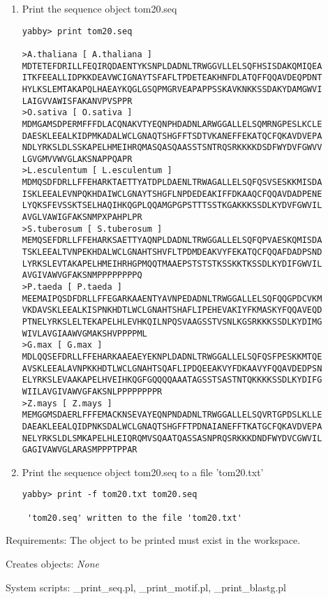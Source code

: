 \begin{description}
\begin{enumerate}
\item Print the sequence object tom20.seq
\begin{verbatim}
yabby> print tom20.seq

>A.thaliana [ A.thaliana ]
MDTETEFDRILLFEQIRQDAENTYKSNPLDADNLTRWGGVLLELSQFHSISDAKQMIQEA
ITKFEEALLIDPKKDEAVWCIGNAYTSFAFLTPDETEAKHNFDLATQFFQQAVDEQPDNT
HYLKSLEMTAKAPQLHAEAYKQGLGSQPMGRVEAPAPPSSKAVKNKKSSDAKYDAMGWVI
LAIGVVAWISFAKANVPVSPPR
>O.sativa [ O.sativa ]
MDMGAMSDPERMFFFDLACQNAKVTYEQNPHDADNLARWGGALLELSQMRNGPESLKCLE
DAESKLEEALKIDPMKADALWCLGNAQTSHGFFTSDTVKANEFFEKATQCFQKAVDVEPA
NDLYRKSLDLSSKAPELHMEIHRQMASQASQAASSTSNTRQSRKKKKDSDFWYDVFGWVV
LGVGMVVWVGLAKSNAPPQAPR
>L.esculentum [ L.esculentum ]
MDMQSDFDRLLFFEHARKTAETTYATDPLDAENLTRWAGALLELSQFQSVSESKKMISDA
ISKLEEALEVNPQKHDAIWCLGNAYTSHGFLNPDEDEAKIFFDKAAQCFQQAVDADPENE
LYQKSFEVSSKTSELHAQIHKQGPLQQAMGPGPSTTTSSTKGAKKKSSDLKYDVFGWVIL
AVGLVAWIGFAKSNMPXPAHPLPR
>S.tuberosum [ S.tuberosum ]
MEMQSEFDRLLFFEHARKSAETTYAQNPLDADNLTRWGGALLELSQFQPVAESKQMISDA
TSKLEEALTVNPEKHDALWCLGNAHTSHVFLTPDMDEAKVYFEKATQCFQQAFDADPSND
LYRKSLEVTAKAPELHMEIHRHGPMQQTMAAEPSTSTSTKSSKKTKSSDLKYDIFGWVIL
AVGIVAWVGFAKSNMPPPPPPPPQ
>P.taeda [ P.taeda ]
MEEMAIPQSDFDRLLFFEGARKAAENTYAVNPEDADNLTRWGGALLELSQFQQGPDCVKM
VKDAVSKLEEALKISPNKHDTLWCLGNAHTSHAFLIPEHEVAKIYFKMASKYFQQAVEQD
PTNELYRKSLELTEKAPELHLEVHKQILNPQSVAAGSSTVSNLKGSRKKKSSDLKYDIMG
WIVLAVGIAAWVGMAKSHVPPPPML
>G.max [ G.max ]
MDLQQSEFDRLLFFEHARKAAEAEYEKNPLDADNLTRWGGALLELSQFQSFPESKKMTQE
AVSKLEEALAVNPKKHDTLWCLGNAHTSQAFLIPDQEEAKVYFDKAAVYFQQAVDEDPSN
ELYRKSLEVAAKAPELHVEIHKQGFGQQQQAAATAGSSTSASTNTQKKKKSSDLKYDIFG
WIILAVGIVAWVGFAKSNLPPPPPPPPR
>Z.mays [ Z.mays ]
MEMGGMSDAERLFFFEMACKNSEVAYEQNPNDADNLTRWGGALLELSQVRTGPDSLKLLE
DAEAKLEEALQIDPNKSDALWCLGNAQTSHGFFTPDNAIANEFFTKATGCFQKAVDVEPA
NELYRKSLDLSMKAPELHLEIQRQMVSQAATQASSASNPRQSRKKKDNDFWYDVCGWVIL
GAGIVAWVGLARASMPPPTPPAR
\end{verbatim}

\item Print the sequence object tom20.seq to a file 'tom20.txt' 
\begin{verbatim}
yabby> print -f tom20.txt tom20.seq

 'tom20.seq' written to the file 'tom20.txt'
\end{verbatim}

\end{enumerate}


\item{Requirements:} The object to be printed must exist in the
workspace.


\item{Creates objects:} {\em None}


\item{System scripts:} \_print\_seq.pl, \_print\_motif.pl, \_print\_blastg.pl

\end{description}

